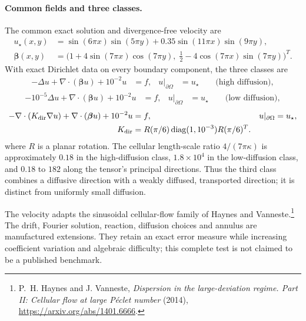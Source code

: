 \paragraph{Common fields and three classes.}
The common exact solution and divergence-free velocity are
\begin{equation}
 \begin{aligned}
 u_\star(x,y)&=\sin(6\pi x)\sin(5\pi y)
                   +0.35\sin(11\pi x)\sin(9\pi y),\\
 \boldsymbol\beta(x,y)&=\bigl(1+4\sin(7\pi x)\cos(7\pi y),\;
              \tfrac12-4\cos(7\pi x)\sin(7\pi y)\bigr)^T.
 \end{aligned}
 \label{eq:adr-oscillatory-fields}
\end{equation}
With exact Dirichlet data on every boundary component, the three classes are
\begin{equation}
 \begin{aligned}
 -\Delta u+\nabla\cdot(\boldsymbol\beta u)+10^{-2}u&=f,
 &u|_{\partial\Omega}&=u_\star \qquad\text{(high diffusion)},
 \end{aligned}
\end{equation}
\begin{equation}
 \begin{aligned}
 -10^{-5}\Delta u+\nabla\cdot(\boldsymbol\beta u)+10^{-2}u&=f,
 &u|_{\partial\Omega}&=u_\star \qquad\text{(low diffusion)},
 \end{aligned}
\end{equation}
\begin{equation}
 \begin{aligned}
 -\nabla\cdot(K_{\rm dir}\nabla u)+\nabla\cdot(\boldsymbol\beta u)+10^{-2}u&=f,
 &u|_{\partial\Omega}&=u_\star,\\
 K_{\rm dir}&=R(\pi/6)\operatorname{diag}(1,10^{-3})R(\pi/6)^T.
 \end{aligned}
 \label{eq:adr-oscillatory-classes}
\end{equation}
where $R$ is a planar rotation. The cellular length-scale ratio
$4/(7\pi\kappa)$ is approximately $0.18$ in the high-diffusion class,
$1.8\times10^4$ in the low-diffusion class, and $0.18$ to $182$ along the
tensor's principal directions. Thus the third class combines a diffusive
direction with a weakly diffused, transported direction; it is distinct from
uniformly small diffusion.

The velocity adapts the sinusoidal cellular-flow family of Haynes and
Vanneste.\footnote{P.~H. Haynes and J. Vanneste,
\emph{Dispersion in the large-deviation regime. Part II: Cellular flow at large
P\'eclet number} (2014), \url{https://arxiv.org/abs/1401.6666}.}
The drift, Fourier solution, reaction, diffusion choices and annulus are
manufactured extensions. They retain an exact error measure while increasing
coefficient variation and algebraic difficulty; this complete test is not
claimed to be a published benchmark.

